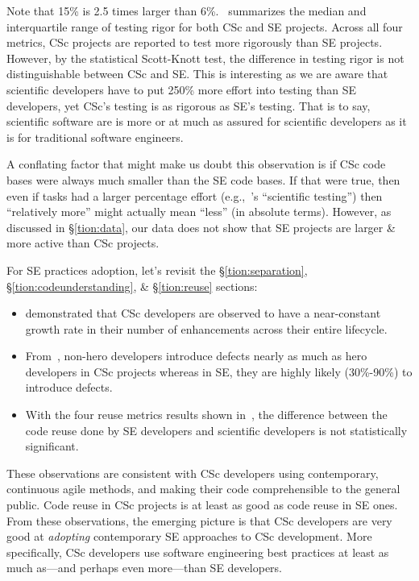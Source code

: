 \documentclass[conference,10pt]{IEEEtran}
\newcommand{\bi}{\begin{itemize}}
\newcommand{\ei}{\end{itemize}}
\begin{document}
Note that 15\% is 2.5 times larger than 6\%.~ summarizes the median and interquartile range of testing rigor for both CSc and SE projects. Across all four metrics, CSc projects are reported to test more rigorously than SE projects. However, by the statistical Scott-Knott test, the difference in testing rigor is not distinguishable between CSc and SE. 
This is interesting as we are aware that scientific  developers have to put 250\%  more effort into testing than SE developers, yet CSc's testing is as rigorous as SE's testing. That is to say, scientific software are is more or at much as assured for scientific developers as it is for traditional software engineers.

A conflating factor that might make us doubt this observation is if CSc code bases were always much smaller than the SE code bases. If that were true, then even if tasks had a larger percentage effort 
(e.g.,~'s ``scientific testing'') then  ``relatively more'' might actually
mean ``less'' (in absolute terms). 
However, as discussed in \S\ref{tion:data}, our data does not show that SE projects are larger \& more active
than CSc projects.



For SE practices adoption, let's revisit the \S\ref{tion:separation}, \S\ref{tion:codeunderstanding}, \& \S\ref{tion:reuse} sections: 

\bi
\item {} demonstrated that CSc developers are observed to have a near-constant growth rate in their number of enhancements across their entire lifecycle.  
\item From~, non-hero developers introduce defects nearly as much as hero developers in CSc projects whereas in SE, they are highly likely (30\%-90\%) to introduce defects.

\item With the four reuse metrics results shown in~, the difference between the code reuse done by SE developers and scientific developers is not statistically significant.

\ei

These observations are consistent with CSc developers using contemporary, continuous agile methods, and making their code comprehensible to the general public. Code reuse in CSc projects is at least as good as code reuse in SE ones. From these observations, the emerging picture is that CSc developers are very good at {\em adopting} contemporary SE approaches to CSc development. More specifically, CSc developers use software engineering best practices at least as much as---and perhaps even more---than SE developers. 
\end{document}
